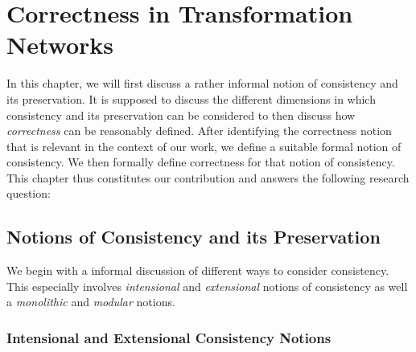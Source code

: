 \chapter{Correctness in Transformation Networks
}



In this chapter, we will first discuss a rather informal notion of consistency and its preservation. It is supposed to discuss the different dimensions in which consistency and its preservation can be considered to then discuss how \emph{correctness} can be reasonably defined.
After identifying the correctness notion that is relevant in the context of our work, we define a suitable formal notion of consistency.
We then formally define correctness for that notion of consistency.
This chapter thus constitutes our contribution  and answers the following research question:


\section{Notions of Consistency and its Preservation}

We begin with a informal discussion of different ways to consider consistency. This especially involves \emph{intensional} and \emph{extensional} notions of consistency as well a \emph{monolithic} and \emph{modular} notions.


\subsection{Intensional and Extensional Consistency Notions}

